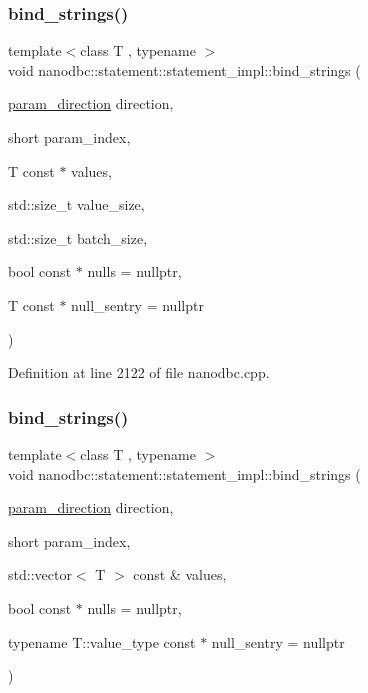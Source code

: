 \subsubsection{\texorpdfstring{bind\_strings()}{bind\_strings()}\hspace{0.1cm}{\footnotesize\ttfamily [1/2]}}
{\footnotesize\ttfamily template$<$class T , typename $>$ \\
void nanodbc\+::statement\+::statement\+\_\+impl\+::bind\+\_\+strings (\begin{DoxyParamCaption}\item[{\mbox{\hyperlink{classnanodbc_1_1statement_a523142f53cbbee8d68a074da993e7fa6}{param\+\_\+direction}}}]{direction,  }\item[{short}]{param\+\_\+index,  }\item[{T const $\ast$}]{values,  }\item[{std\+::size\+\_\+t}]{value\+\_\+size,  }\item[{std\+::size\+\_\+t}]{batch\+\_\+size,  }\item[{bool const $\ast$}]{nulls = {\ttfamily nullptr},  }\item[{T const $\ast$}]{null\+\_\+sentry = {\ttfamily nullptr} }\end{DoxyParamCaption})}



Definition at line 2122 of file nanodbc.\+cpp.

\mbox{\label{classnanodbc_1_1statement_1_1statement__impl_aa28b053b001c2e709062a138cadcbe4f}} 
\subsubsection{\texorpdfstring{bind\_strings()}{bind\_strings()}\hspace{0.1cm}{\footnotesize\ttfamily [2/2]}}
{\footnotesize\ttfamily template$<$class T , typename $>$ \\
void nanodbc\+::statement\+::statement\+\_\+impl\+::bind\+\_\+strings (\begin{DoxyParamCaption}\item[{\mbox{\hyperlink{classnanodbc_1_1statement_a523142f53cbbee8d68a074da993e7fa6}{param\+\_\+direction}}}]{direction,  }\item[{short}]{param\+\_\+index,  }\item[{std\+::vector$<$ T $>$ const \&}]{values,  }\item[{bool const $\ast$}]{nulls = {\ttfamily nullptr},  }\item[{typename T\+::value\+\_\+type const $\ast$}]{null\+\_\+sentry = {\ttfamily nullptr} }\end{DoxyParamCaption})}



